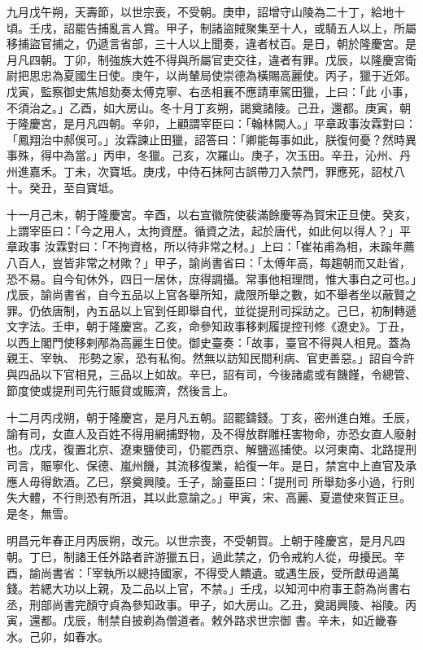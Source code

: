 \begin{pinyinscope}
 九月戊午朔，天壽節，以世宗喪，不受朝。庚申，詔增守山陵為二十丁，給地十頃。壬戌，詔罷告捕亂言人賞。甲子，制諸盜賊聚集至十人，或騎五人以上，所屬移捕盜官捕之，仍遞言省部，三十人以上聞奏，違者杖百。是日，朝於隆慶宮。是月凡四朝。丁卯，制強族大姓不得與所屬官吏交往，違者有罪。戊辰，以隆慶宮衛尉把思忠為夏國生日使。庚午，以尚輦局使崇德為橫賜高麗使。丙子，獵于近郊。戊寅，監察御史焦旭劾奏太傅克寧、右丞相襄不應請車駕田獵，上曰：「此
 小事，不須治之。」乙酉，如大房山。冬十月丁亥朔，謁奠諸陵。己丑，還都。庚寅，朝于隆慶宮，是月凡四朝。辛卯，上顧謂宰臣曰：「翰林闕人。」平章政事汝霖對曰：「鳳翔治中郝俁可。」汝霖諫止田獵，詔答曰：「卿能每事如此，朕復何憂？然時異事殊，得中為當。」丙申，冬獵。己亥，次羅山。庚子，次玉田。辛丑，沁州、丹州進嘉禾。丁未，次寶坻。庚戌，中侍石抹阿古誤帶刀入禁門，罪應死，詔杖八十。癸丑，至自寶坻。



 十一月己未，朝于隆慶宮。辛酉，以右宣徽院使裴滿餘慶等為賀宋正旦使。癸亥，上謂宰臣曰：「今之用人，太拘資歷。循資之法，起於唐代，如此何以得人？」平章政事
 汝霖對曰：「不拘資格，所以待非常之材。」上曰：「崔祐甫為相，未踰年薦八百人，豈皆非常之材歟？」甲子，諭尚書省曰：「太傅年高，每趨朝而又赴省，恐不易。自今旬休外，四日一居休，庶得調攝。常事他相理問，惟大事白之可也。」戊辰，諭尚書省，自今五品以上官各舉所知，歲限所舉之數，如不舉者坐以蔽賢之罪。仍依唐制，內五品以上官到任即舉自代，並從提刑司採訪之。己巳，初制轉遞文字法。壬申，朝于隆慶宮。乙亥，命參知政事移剌履提控刊修《遼史》。丁丑，以西上閣門使移剌邴為高麗生日使。御史臺奏：「故事，臺官不得與人相見。蓋為親王、宰執、
 形勢之家，恐有私徇。然無以訪知民間利病、官吏善惡。」詔自今許與四品以下官相見，三品以上如故。辛巳，詔有司，今後諸處或有饑饉，令總管、節度使或提刑司先行賑貸或賑濟，然後言上。



 十二月丙戌朔，朝于隆慶宮，是月凡五朝。詔罷鑄錢。丁亥，密州進白雉。壬辰，諭有司，女直人及百姓不得用網捕野物，及不得放群雕枉害物命，亦恐女直人廢射也。戊戌，復置北京、遼東鹽使司，仍罷西京、解鹽巡捕使。以河東南、北路提刑司言，賑寧化、保德、嵐州饑，其流移復業，給復一年。是日，禁宮中上直官及承應人毋得飲酒。乙巳，祭奠興陵。壬子，諭臺臣曰：「提刑司
 所舉劾多小過，行則失大體，不行則恐有所沮，其以此意諭之。」甲寅，宋、高麗、夏遣使來賀正旦。是冬，無雪。



 明昌元年春正月丙辰朔，改元。以世宗喪，不受朝賀。上朝于隆慶宮，是月凡四朝。丁巳，制諸王任外路者許游獵五日，過此禁之，仍令戒約人從，毋擾民。辛酉，諭尚書省：「宰執所以總持國家，不得受人饋遺。或遇生辰，受所獻毋過萬錢。若緦大功以上親，及二品以上官，不禁。」壬戌，以知河中府事王蔚為尚書右丞，刑部尚書完顏守貞為參知政事。甲子，如大房山。乙丑，奠謁興陵、裕陵。丙寅，還都。戊辰，制禁自披剃為僧道者。敕外路求世宗御
 書。辛未，如近畿春水。己卯，如春水。




\end{pinyinscope}
